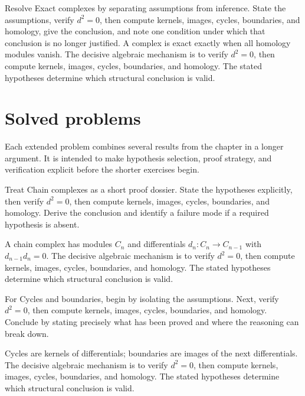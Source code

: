 \begin{example}\label{ex:v22-worked-04}
Resolve Exact complexes by separating assumptions from inference. State the assumptions, verify \(d^2=0\), then compute kernels, images, cycles, boundaries, and homology, give the conclusion, and note one condition under which that conclusion is no longer justified. A complex is exact exactly when all homology modules vanish. The decisive algebraic mechanism is to verify \(d^2=0\), then compute kernels, images, cycles, boundaries, and homology. The stated hypotheses determine which structural conclusion is valid.
\end{example}

\section{Solved problems}
Each extended problem combines several results from the chapter in a longer argument. It is intended to make hypothesis selection, proof strategy, and verification explicit before the shorter exercises begin.

\begin{problem}\label{prob:v22-problem-01}
Treat Chain complexes as a short proof dossier. State the hypotheses explicitly, then verify \(d^2=0\), then compute kernels, images, cycles, boundaries, and homology. Derive the conclusion and identify a failure mode if a required hypothesis is absent.
\end{problem}
\begin{solution}
A chain complex has modules $C_n$ and differentials $d_n:C_n\to C_{n-1}$ with $d_{n-1}d_n=0$. The decisive algebraic mechanism is to verify \(d^2=0\), then compute kernels, images, cycles, boundaries, and homology. The stated hypotheses determine which structural conclusion is valid.
\end{solution}

\begin{problem}\label{prob:v22-problem-02}
For Cycles and boundaries, begin by isolating the assumptions. Next, verify \(d^2=0\), then compute kernels, images, cycles, boundaries, and homology. Conclude by stating precisely what has been proved and where the reasoning can break down.
\end{problem}
\begin{solution}
Cycles are kernels of differentials; boundaries are images of the next differentials. The decisive algebraic mechanism is to verify \(d^2=0\), then compute kernels, images, cycles, boundaries, and homology. The stated hypotheses determine which structural conclusion is valid.
\end{solution}


